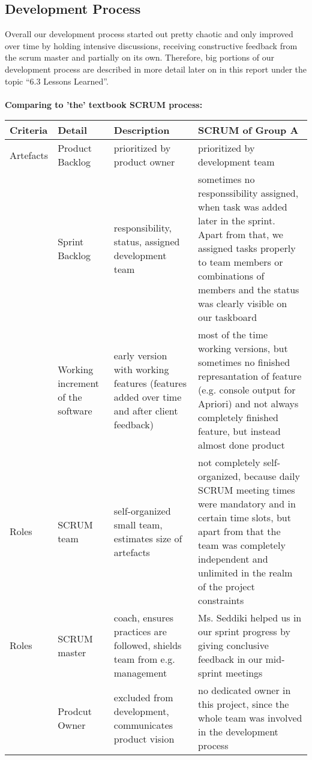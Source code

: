
\subsection{Development Process}

Overall our development process started out pretty chaotic and only improved over time by holding intensive discussions, receiving constructive feedback from the scrum master and partially on its own. Therefore, big portions of our development process are described in more detail later on in this report under the topic “6.3 Lessons Learned”.\\
\ \\
{\large\textbf{Comparing to 'the' textbook SCRUM process:}}\\
\begin{longtable}{|p{}|p{}|p{}|p{}|}
\hline
    Criteria & Detail & Description & SCRUM of Group A\\
    \hline
    \hline
    Artefacts & Product Backlog & prioritized by product owner & prioritized by development team \\\cline{2-4}
      & Sprint Backlog & responsibility, status, assigned development team & sometimes no responssibility assigned, when task was added later in the sprint. Apart from that, we assigned tasks properly to team members or combinations of members and the status was clearly visible on our taskboard\\\cline{2-4}
      & Working increment of the software & early version with working features (features added over time and after client feedback) & most of the time working versions, but sometimes no finished represantation of feature (e.g. console output for Apriori) and not always completely finished feature, but instead almost done product \\
    \hline
    Roles & SCRUM team & self-organized small team, estimates size of artefacts & not completely self-organized, because daily SCRUM meeting times were mandatory and in certain time slots, but apart from that the team was completely independent and unlimited in the realm of the project constraints \\\hline 
     Roles & SCRUM master & coach, ensures practices are followed, shields team from e.g. management & Ms. Seddiki helped us in our sprint progress by giving conclusive feedback in our mid-sprint meetings \\\cline{2-4}
       & Prodcut Owner & excluded from development, communicates product vision & no dedicated owner in this project, since the whole team was involved in the development process \\

\end{longtable}
